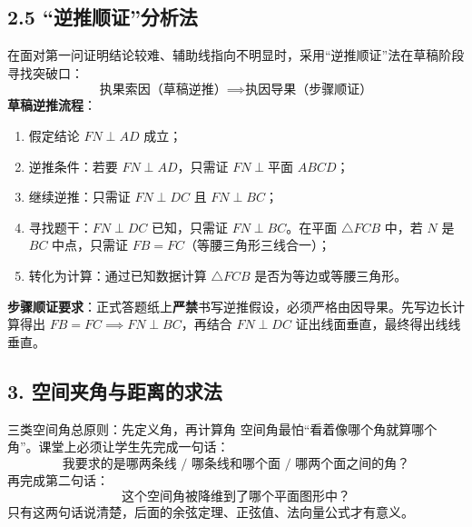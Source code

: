 \documentclass[11pt,a4paper]{ctexart}
\begin{document}
\subsection*{2.5 “逆推顺证”分析法}

在面对第一问证明结论较难、辅助线指向不明显时，采用“逆推顺证”法在草稿阶段寻找突破口：
\[
  \boxed{\text{执果索因（草稿逆推）} \implies \text{执因导果（步骤顺证）}}
\]
\textbf{草稿逆推流程}：
\begin{enumerate}
  \item 假定结论 $FN \perp AD$ 成立；
  \item 逆推条件：若要 $FN \perp AD$，只需证 $FN \perp \text{平面 } ABCD$；
  \item 继续逆推：只需证 $FN \perp DC$ 且 $FN \perp BC$；
  \item 寻找题干：$FN \perp DC$ 已知，只需证 $FN \perp BC$。在平面 $\triangle FCB$ 中，若 $N$ 是 $BC$ 中点，只需证 $FB = FC$（等腰三角形三线合一）；
  \item 转化为计算：通过已知数据计算 $\triangle FCB$ 是否为等边或等腰三角形。
\end{enumerate}
\textbf{步骤顺证要求}：正式答题纸上\textbf{严禁}书写逆推假设，必须严格由因导果。先写边长计算得出 $FB=FC \implies FN \perp BC$，再结合 $FN \perp DC$ 证出线面垂直，最终得出线线垂直。

\subsection*{3. 空间夹角与距离的求法}

\begin{teachbox}{三类空间角总原则：先定义角，再计算角}
空间角最怕“看着像哪个角就算哪个角”。课堂上必须让学生先完成一句话：
\[
  \boxed{\text{我要求的是哪两条线 / 哪条线和哪个面 / 哪两个面之间的角？}}
\]
再完成第二句话：
\[
  \boxed{\text{这个空间角被降维到了哪个平面图形中？}}
\]
只有这两句话说清楚，后面的余弦定理、正弦值、法向量公式才有意义。
\end{teachbox}
\end{document}
